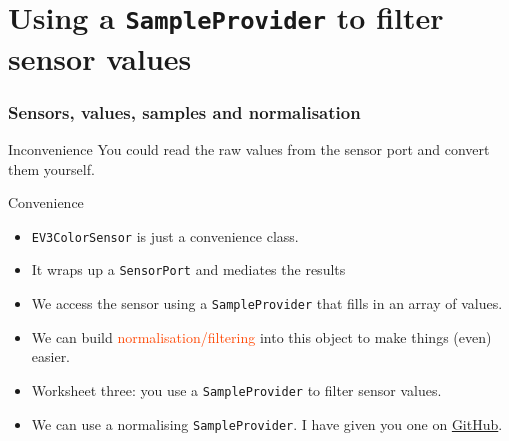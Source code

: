 \documentclass[color=pdftex,usenames,dvipsnames, aspectratio=169]{beamer}
\begin{document}
\section{Using a \lstinline!SampleProvider! to filter sensor values}

\begin{frame}
\frametitle{Sensors, values, samples and normalisation}
\begin{block}{Inconvenience}
You could read the raw values from the sensor port and convert them yourself.
\end{block}

\begin{block}{Convenience}
\begin{itemize}
\item \lstinline!EV3ColorSensor! is just a convenience class.
\item  It wraps up a \lstinline!SensorPort! and mediates the results
\item We access the sensor using a \lstinline!SampleProvider! that fills in an array of values.
\item We can build \textcolor{OrangeRed}{normalisation/filtering} into this object to make things (even) easier.
\item \textcolor{RedOrange}{Worksheet three: you use a \lstinline!SampleProvider! to filter sensor values.}
\item We can use a normalising \lstinline{SampleProvider}. I have given you one on \href{https://github.com/cyclingProfessor/LejosExamples/blob/master/MinMaxFilter.java}{GitHub}. 
\end{itemize}
\end{block}
\end{frame}
\end{document}
